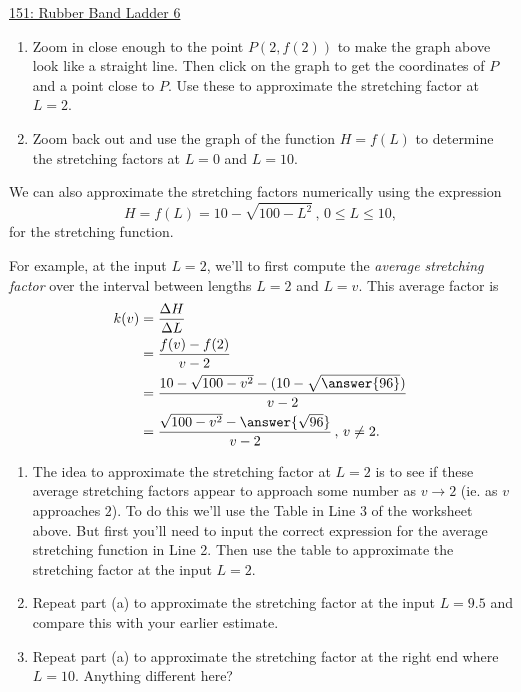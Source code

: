 \documentclass{ximera}
\begin{document}
\begin{example}
\href{https://www.desmos.com/calculator/jfwvbbrts1}{151: Rubber Band Ladder 6}

\begin{enumerate}
\item Zoom in close enough to the point $P(2,f(2))$ to make the graph above look like a straight line. Then click on the graph to get the coordinates of $P$ and a point close to $P$. Use these to approximate the stretching factor at $L=2$.


\item Zoom back out and use the graph of the function $H=f(L)$ to determine the stretching factors at $L=0$ and $L=10$.
\end{enumerate}

We can also approximate the stretching factors numerically using the expression
\[
      H = f(L) = 10- \sqrt{100-L^2} \, , \, 0\leq L \leq 10,
\] 
for the stretching function.

For example, at the input $L=2$, we'll to first compute the \emph{average stretching factor} over the interval between lengths $L=2$ and $L=v$. This average factor is 
\begin{align*}
 k(v) &= \frac{\Delta H}{\Delta L} \\
              &= \frac{f(v) - f(2)}{v-2} \\
              &=\frac{10 - \sqrt{100-v^2} - (10 - \sqrt{\answer{96}})}{v-2}   \\
              &= \frac{\sqrt{100-v^2} - \answer{\sqrt{96}}}{v-2} \, , \, v \neq 2.
\end{align*}

\begin{enumerate}
\item The idea to approximate the stretching factor at $L=2$ is to see if these average stretching factors appear to approach some number as $v\to 2$ (ie. as $v$ approaches $2$). To do this we'll use the Table in Line 3 of the worksheet above. But first you'll need to input the correct expression for the average stretching function in Line 2. Then use the table to approximate the stretching factor at the input $L=2$.

\item Repeat part (a) to approximate the stretching factor at the input $L=9.5$ and compare this with your earlier estimate.

\item Repeat part (a) to approximate the stretching factor at the right end where $L=10$. Anything different here?
\end{enumerate}
 
\end{example}
\end{document}
